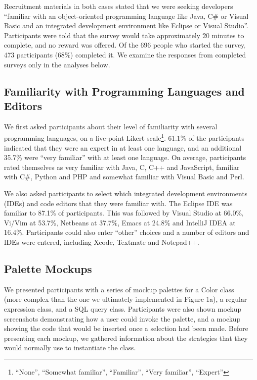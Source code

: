 \documentclass[10pt, conference, compsocconf]{IEEEtran}
\begin{document}
Recruitment materials in both cases stated that we were seeking developers ``familiar with an object-oriented programming language like Java, C\# or Visual Basic and an integrated development environment like Eclipse or Visual Studio''.
Participants were told that the survey would take approximately 20 minutes to complete, and no reward was offered. Of the 696 people who started the survey, 473 participants (68\%) completed it. We examine the responses from completed surveys only in the analyses below.

\subsection{Familiarity with Programming Languages and Editors}

We first asked participants about their level of familiarity with several programming languages, on a five-point Likert scale\footnote{``None'', ``Somewhat familiar'', ``Familiar'', ``Very familiar'', ``Expert''}. 61.1\% of the participants indicated that they were an expert in at least one language, and an additional 35.7\% were ``very familiar'' with at least one language. On average, participants rated themselves as very familiar with Java, C, C++ and JavaScript, familiar with C\#, Python and PHP and somewhat familiar with Visual Basic and Perl.

We also asked participants to select which integrated development environments (IDEs) and code editors that they were familiar with. The Eclipse IDE was familiar to 87.1\% of participants. This was followed by Visual Studio at 66.0\%, Vi/Vim at 53.7\%, Netbeans at 37.7\%, Emacs at 24.8\% and IntelliJ IDEA at 16.4\%. Participants could also enter ``other'' choices and a number of editors and IDEs were entered, including Xcode, Textmate and Notepad++.

\subsection{Palette Mockups}

%
We presented participants with a series of mockup palettes for a Color class (more complex than the one we ultimately implemented in Figure 1a), a regular expression class, and a SQL query class. Participants were also shown mockup screenshots demonstrating how a user could invoke the palette, and a mockup showing the code that would be inserted once a selection had been made. Before presenting each mockup, we gathered information about  the strategies that they would normally use to instantiate the class.
\end{document}
